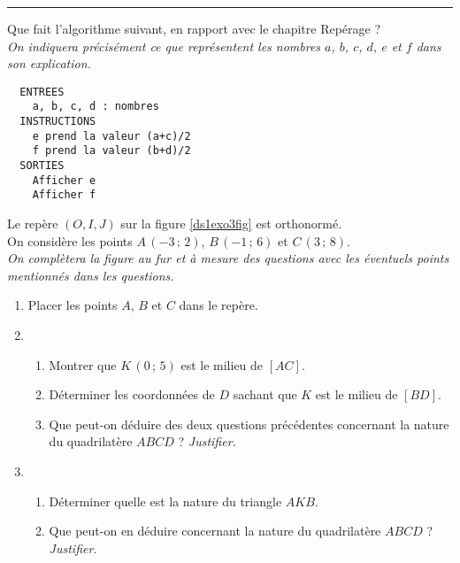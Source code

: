 \medskip

\hrule

\begin{exo}[3 points]\label{ds1exo2}
 Que fait l'algorithme suivant, en rapport avec le chapitre \og Rep\'erage \fg{} ?\\ \emph{On indiquera pr\'ecis\'ement ce que repr\'esentent les nombres $a$, $b$, $c$, $d$, $e$ et $f$ dans son explication.
}
\begin{algo}
 \begin{verbatim}
  ENTREES
    a, b, c, d : nombres
  INSTRUCTIONS
    e prend la valeur (a+c)/2
    f prend la valeur (b+d)/2
  SORTIES
    Afficher e
    Afficher f
 \end{verbatim}

\end{algo}
\end{exo}


\medskip


\begin{exo}[10 points]\label{ds1exo3}
Le rep\`ere $(O,I,J)$ sur la figure \ref{ds1exo3fig}  est orthonorm\'e. \\ On consid\`ere les points $A\,(-3\,;\,2)$, $B\,(-1\,;\,6)$ et $C\,(3\,;\,8)$.\\
 \emph{On compl\`etera la figure au fur et \`a mesure des questions avec les \'eventuels points mentionn\'es dans les questions.}
\begin{enumerate}
 \item Placer les points $A$, $B$ et $C$ dans le rep\`ere.
 \item \begin{enumerate}
        \item Montrer que $K\,(0\,;\,5)$ est le milieu de $[AC]$.
	\item D\'eterminer les coordonn\'ees de $D$ sachant que $K$ est le milieu de $[BD]$.
	\item Que peut-on d\'eduire des deux questions pr\'ec\'edentes concernant la nature du quadrilat\`ere $ABCD$ ? \emph{Justifier.}
       \end{enumerate}
 \item \begin{enumerate}
        \item D\'eterminer quelle est la nature du triangle $AKB$.
        \item Que peut-on en d\'eduire concernant la nature du quadrilat\`ere $ABCD$ ? \emph{Justifier.}
       \end{enumerate}

\end{enumerate}

\end{exo}


